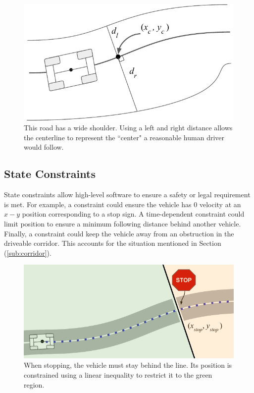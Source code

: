 \documentclass[letterpaper, 10 pt, conference]{ieeeconf}  %
\begin{document}
\begin{figure}[h]
	\centering
	\includegraphics[width=0.9\linewidth]{figures/corridor_with_turnout.pdf}
	\caption{This road has a wide shoulder. Using a left and right distance allows the centerline to represent the ``center" a reasonable human driver would follow.}
	\label{fig:corridor_with_shoulder}
\end{figure}



\subsection{State Constraints}\label{sub:constraints}
State constraints allow high-level software to ensure a safety or legal requirement is met. For example, a constraint could ensure the vehicle has 0 velocity at an $x-y$ position corresponding to a stop sign. A time-dependent constraint could limit position to ensure a minimum following distance behind another
vehicle. Finally, a constraint could keep the vehicle away from an obstruction in the driveable corridor. This accounts for the situation mentioned in Section (\ref{sub:corridor}).

\begin{figure}[h]
	\centering
	\includegraphics[width=0.9\linewidth]{figures/stop.pdf}
	\caption{When stopping, the vehicle must stay behind the line. Its position is constrained using a linear inequality to restrict it to the green region.} 
	\label{fig:stopsign}
\end{figure}
\end{document}
